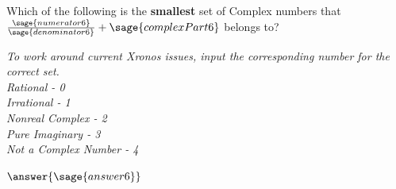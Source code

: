 \documentclass{ximera}
\begin{document}
\begin{question}
Which of the following is the \textbf{smallest} set of Complex numbers that $\frac{\sage{numerator6}}{\sage{denominator6}} + \sage{complexPart6} $ belongs to?
	
\textit{To work around current Xronos issues, input the corresponding number for the correct set. \\
Rational - 0 \\
Irrational - 1 \\
Nonreal Complex - 2 \\
Pure Imaginary - 3 \\
Not a Complex Number - 4 
}
	
$\answer{\sage{answer6}}$
	
\end{question}
\end{document}
